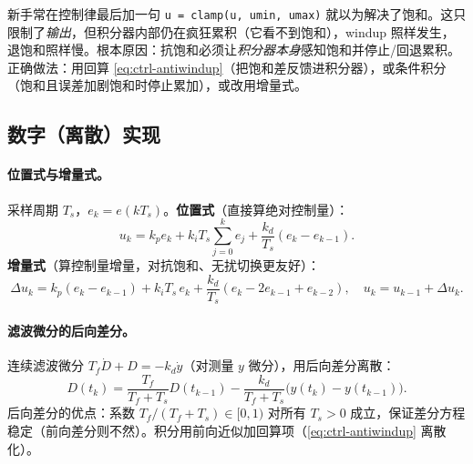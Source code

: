 \begin{pitfall}
新手常在控制律最后加一句 \texttt{u = clamp(u, umin, umax)} 就以为解决了饱和。这只限制了\emph{输出}，但积分器内部仍在疯狂累积（它看不到饱和），windup 照样发生，退饱和照样慢。根本原因：抗饱和必须让\emph{积分器本身}感知饱和并停止/回退累积。正确做法：用回算 \cref{eq:ctrl-antiwindup}（把饱和差反馈进积分器），或条件积分（饱和且误差加剧饱和时停止累加），或改用增量式。
\end{pitfall}

\subsection{数字（离散）实现}
\label{sec:ctrl-pid-digital}

\paragraph{位置式与增量式。}
采样周期 $T_s$，$e_k=e(kT_s)$。\textbf{位置式}（直接算绝对控制量）：
\begin{equation}
  u_k=k_pe_k+k_iT_s\sum_{j=0}^{k}e_j+\frac{k_d}{T_s}(e_k-e_{k-1}).
  \label{eq:ctrl-pid-position}
\end{equation}
\textbf{增量式}（算控制量增量，对抗饱和、无扰切换更友好）：
\begin{equation}
  \Delta u_k=k_p(e_k-e_{k-1})+k_iT_s\,e_k+\frac{k_d}{T_s}(e_k-2e_{k-1}+e_{k-2}),\quad u_k=u_{k-1}+\Delta u_k.
  \label{eq:ctrl-pid-velocity}
\end{equation}

\paragraph{滤波微分的后向差分。}
连续滤波微分 $T_f\dot D+D=-k_d\dot y$（对测量 $y$ 微分），用后向差分离散\cite{astrom2008feedback}：
\begin{equation}
  D(t_k)=\frac{T_f}{T_f+T_s}D(t_{k-1})-\frac{k_d}{T_f+T_s}\big(y(t_k)-y(t_{k-1})\big).
  \label{eq:ctrl-pid-Ddiff}
\end{equation}
后向差分的优点：系数 $T_f/(T_f+T_s)\in[0,1)$ 对所有 $T_s>0$ 成立，保证差分方程稳定（前向差分则不然）。积分用前向近似加回算项（\cref{eq:ctrl-antiwindup} 离散化）。

